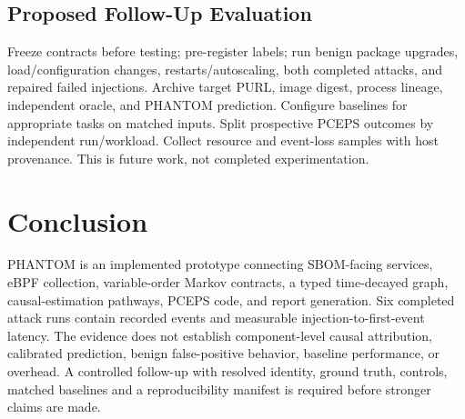 \documentclass[12pt,a4paper,oneside]{report}
\begin{document}
\section{Proposed Follow-Up Evaluation}
Freeze contracts before testing; pre-register labels; run benign package upgrades, load/configuration changes, restarts/autoscaling, both completed attacks, and repaired failed injections. Archive target PURL, image digest, process lineage, independent oracle, and PHANTOM prediction. Configure baselines for appropriate tasks on matched inputs. Split prospective PCEPS outcomes by independent run/workload. Collect resource and event-loss samples with host provenance. This is future work, not completed experimentation.

\chapter{Conclusion}
PHANTOM is an implemented prototype connecting SBOM-facing services, eBPF collection, variable-order Markov contracts, a typed time-decayed graph, causal-estimation pathways, PCEPS code, and report generation. Six completed attack runs contain recorded events and measurable injection-to-first-event latency. The evidence does not establish component-level causal attribution, calibrated prediction, benign false-positive behavior, baseline performance, or overhead. A controlled follow-up with resolved identity, ground truth, controls, matched baselines and a reproducibility manifest is required before stronger claims are made.
\end{document}
